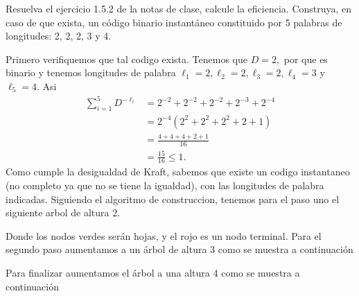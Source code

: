 
Resuelva el ejercicio 1.5.2 de la notas de clase, calcule la eficiencia.
Construya, en caso de que exista, un código binario instantáneo constituido por 5 palabras de longitudes: 2, 2, 2, 3 y 4.
\begin{sols}
    Primero verifiquemos que tal codigo exista. Tenemos que $D=2,$ por que es binario y tenemos longitudes de palabra $\ell_1=2,\ell_2=2, \ell_3=2, \ell_4=3$ y $\ell_5=4.$ Asi
    \begin{align*}
        \sum_{i=1}^5 D^{-\ell_i}&=2^{-2}+2^{-2}+2^{-2}+2^{-3}+2^{-4}\\
        &=2^{-4}(2^2+2^2+2^2+2+1)\\
        &=\frac{4+4+4+2+1}{16}\\
        &=\frac{15}{16}\leq 1.
    \end{align*}
    Como cumple la desigualdad de Kraft, sabemos que existe un codigo instantaneo (no completo ya que no se tiene la igualdad), con las longitudes de palabra indicadas. Siguiendo el algoritmo de construccion, tenemos para el paso uno el siguiente arbol de altura 2.
    \begin{center}
    \end{center}
Donde los nodos verdes serán hojas, y el rojo es un nodo terminal. Para el segundo paso aumentamos a un árbol de altura 3 como se muestra a continuación
\begin{center}
    \end{center}
Para finalizar aumentamos el árbol a una altura 4 como se muestra a continuación


\end{sols}
